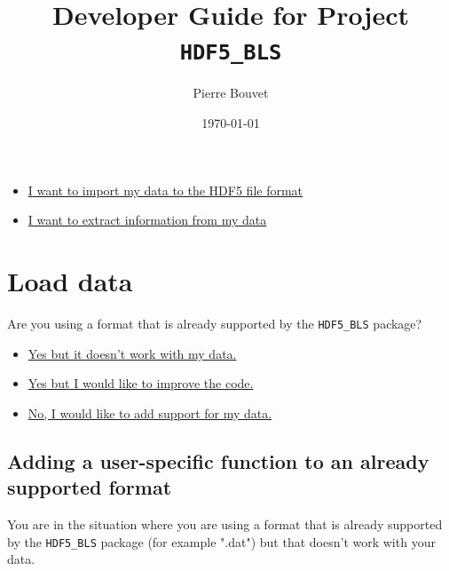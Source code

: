 \documentclass[a4paper,12pt]{article}
\title{Developer Guide for Project \texttt{HDF5\_BLS}}
\author{Pierre Bouvet}
\date{\today}
\begin{document}
\maketitle


\begin{tcolorbox}[title=Why are you here?]
    \begin{itemize}
        \item \hyperref[sec:load_data]{I want to import my data to the HDF5 file format}
        \item \hyperref[sec:treatment]{I want to extract information from my data }
    \end{itemize}
\end{tcolorbox}

\section{Load data} \label{sec:load_data}

    \begin{tcolorbox}
        Are you using a format that is already supported by the \texttt{HDF5\_BLS} package?
        \begin{itemize}
            \item \hyperref[subsec:load_data.user_specific]{Yes but it doesn't work with my data.}
            \item \hyperref[subsec:load_data.improvement]{Yes but I would like to improve the code.}
            \item \hyperref[subsec:load_data.new_format]{No, I would like to add support for my data.}
        \end{itemize}
    \end{tcolorbox}

    \subsection{Adding a user-specific function to an already supported format} \label{subsec:load_data.user_specific}

        \begin{tcolorbox}
            You are in the situation where you are using a format that is already supported by the \texttt{HDF5\_BLS} package (for example ".dat") but that doesn't work with your data.
        \end{tcolorbox}
\end{document}
